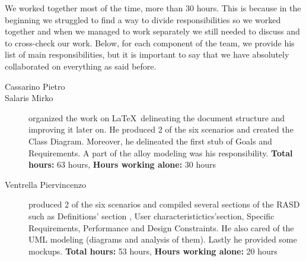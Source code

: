We worked together most of the time, more than 30 hours. This is because in the beginning we struggled to find a way to divide responsibilities so we worked together and when we managed to work separately we still needed to discuss and to cross-check our work.\newline
Below, for each component of the team, we provide his list of main responsibilities, but it is important to say that we have absolutely collaborated on everything as said before.

\begin{description}
	\item[Cassarino Pietro] %
	\item[Salaris Mirko] organized the work on \LaTeX\ delineating the document structure and improving it later on. He produced 2 of the six scenarios and created the Class Diagram. Moreover, he delineated the first stub of Goals and Requirements. A part of the alloy modeling was his responsibility.\newline
	\textbf{Total hours:} 63 hours, \textbf{Hours working alone:} 30 hours
	\item[Ventrella Piervincenzo] produced 2 of the six scenarios and compiled several sections of the RASD such as Definitions' section , User characteristictics'section, Specific Requirements, Performance and Design Constraints. He also cared of the UML modeling (diagrams and analysis of them). Lastly he provided some mockups. \newline
	\textbf{Total hours:} 53 hours, \textbf{Hours working alone:} 20 hours
\end{description}